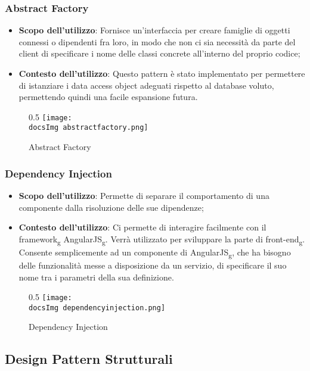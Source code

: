 		\subsubsection{Abstract Factory }
		\begin{itemize}\itemsep1pt
			\item \textbf{Scopo dell'utilizzo}: Fornisce un'interfaccia per creare famiglie di oggetti connessi o dipendenti fra loro, in modo che non ci sia necessità da parte del client di specificare i nome delle classi concrete all'interno del proprio codice;
			\item \textbf{Contesto dell'utilizzo}: Questo pattern è stato implementato per permettere di istanziare i data access object adeguati rispetto al database voluto, permettendo quindi una facile espansione futura. 
		\end{itemize}
		\begin{figure}[H]{0.5}
			\centering
			\texttt{[image: \\docsImg abstractfactory.png]}
			\caption{Abstract Factory}
			\label{fig. Abstract Factory}
		\end{figure}
		
		\subsubsection{Dependency Injection}
		\begin{itemize}\itemsep1pt
			\item\textbf{Scopo dell'utilizzo}: Permette di separare il comportamento di una componente dalla risoluzione delle sue dipendenze;
			\item\textbf{Contesto dell'utilizzo}: Ci permette di interagire facilmente con il framework\textsubscript{g} AngularJS\textsubscript{g}. Verrà utilizzato per sviluppare la parte di front-end\textsubscript{g}. Consente semplicemente ad un componente di AngularJS\textsubscript{g}, che ha bisogno delle funzionalità messe a disposizione da un servizio, di specificare il suo nome tra i parametri della sua definizione.
		\end{itemize}
		\begin{figure}[H]{0.5}
			\centering
			\texttt{[image: \\docsImg dependencyinjection.png]}
			\caption{Dependency Injection}
			\label{fig. Dependency Injection}
		\end{figure}

	\subsection{Design Pattern Strutturali}

